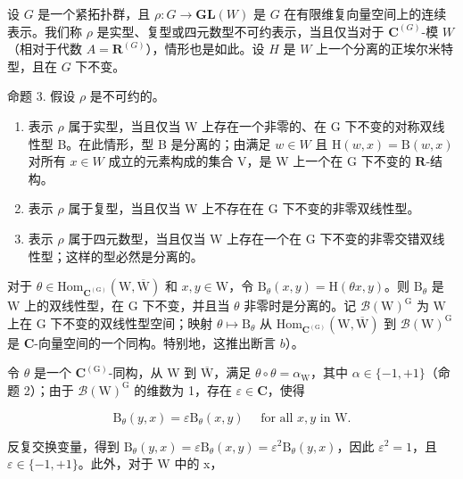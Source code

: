 
设 \(G\) 是一个紧拓扑群，且 \(\rho : G \to \mathbf{GL}(W)\) 是 \(G\) 在有限维复向量空间上的连续表示。我们称 \(\rho\) 是实型、复型或四元数型不可约表示，当且仅当对于 \(\mathbf{C}^{(G)}\)-模 \(W\)（相对于代数 \(A = \mathbf{R}^{(G)}\)），情形也是如此。设 \(H\) 是 \(W\) 上一个分离的正埃尔米特型，且在 \(G\) 下不变。

命题 3. 假设 \(\rho\) 是不可约的。

\begin{enumerate}
\def\labelenumi{\alph{enumi})}
\item
  表示 \(\rho\) 属于实型，当且仅当 W 上存在一个非零的、在 G 下不变的对称双线性型 B。在此情形，型 B 是分离的；由满足 \(w \in W\) 且 \(\mathrm{H}(w, x) = \mathrm{B}(w, x)\) 对所有 \(x \in W\) 成立的元素构成的集合 V，是 W 上一个在 G 下不变的 \(\mathbf{R}\)-结构。
\item
  表示 \(\rho\) 属于复型，当且仅当 W 上不存在在 G 下不变的非零双线性型。
\item
  表示 \(\rho\) 属于四元数型，当且仅当 W 上存在一个在 G 下不变的非零交错双线性型；这样的型必然是分离的。
\end{enumerate}

对于 \(\theta \in \mathrm{Hom}_{\mathbf{C}^{(\mathrm{G})}}(\mathrm{W},\overline{\mathrm{W}})\) 和 \(x,y\in \mathrm{W}\)，令 \(\mathrm{B}_{\theta}(x,y) = \mathrm{H}(\theta x,y)\)。则 \(\mathrm{B}_{\theta}\) 是 \(\mathrm{W}\) 上的双线性型，在 \(\mathrm{G}\) 下不变，并且当 \(\theta\) 非零时是分离的。记 \(\mathcal{B}(\mathrm{W})^{\mathrm{G}}\) 为 \(\mathrm{W}\) 上在 \(\mathrm{G}\) 下不变的双线性型空间；映射 \(\theta \mapsto \mathrm{B}_{\theta}\) 从 \(\mathrm{Hom}_{\mathbf{C}^{(\mathrm{G})}}(\mathrm{W},\overline{\mathrm{W}})\) 到 \(\mathcal{B}(\mathrm{W})^{\mathrm{G}}\) 是 \(\mathbf{C}\)-向量空间的一个同构。特别地，这推出断言 \(b\)）。

令 \(\theta\) 是一个 \(\mathbf{C}^{(\mathrm{G})}\)-同构，从 W 到 \(\overline{\mathrm{W}}\)，满足 \(\theta \circ \theta = \alpha_{\mathrm{W}}\)，其中 \(\alpha \in \{-1, +1\}\)（命题 2）；由于 \(\mathcal{B}(\mathrm{W})^{\mathrm{G}}\) 的维数为 1，存在 \(\varepsilon \in \mathbf{C}\)，使得

\[
\mathrm{B} _ {\theta} (y, x) = \varepsilon \mathrm{B} _ {\theta} (x, y) \quad \text { for   all } x, y \text { in } \mathrm{W}.
\]

反复交换变量，得到 \(\mathrm{B}_{\theta}(y,x)=\varepsilon\mathrm{B}_{\theta}(x,y)=\varepsilon^{2}\mathrm{B}_{\theta}(y,x)\)，因此 \(\varepsilon^{2}=1\)，且 \(\varepsilon\in\{-1,+1\}\)。此外，对于 W 中的 x，

